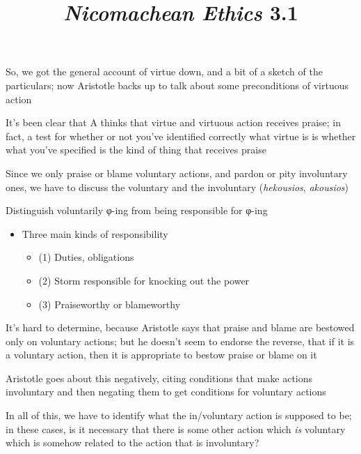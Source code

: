 \documentclass[11pt]{article}
\title{\emph{Nicomachean Ethics} 3.1}
\author{}
\date{}
\newcommand{\gk}[1]{\textgreek{#1}}
\begin{document}
\maketitle

\noindent So, we got the general account of virtue down, and a bit of a sketch of the particulars; now Aristotle backs up to talk about some preconditions of virtuous action
\vspace*{2mm}

\noindent It's been clear that A thinks that virtue and virtuous action receives praise; in fact, a test for whether or not you've identified correctly what virtue is is whether what you've specified is the kind of thing that receives praise
\vspace*{2mm}

\noindent Since we only praise or blame voluntary actions, and pardon or pity involuntary ones, we have to discuss the voluntary and the involuntary (\emph{hekousios}, \emph{akousios})
\vspace*{2mm}

\noindent Distinguish voluntarily \gk{φ}-ing from being responsible for \gk{φ}-ing

\begin{itemize}\item{Three main kinds of responsibility}\begin{itemize}\item{(1) Duties, obligations}\item{(2) Storm responsible for knocking out the power}\item{(3) Praiseworthy or blameworthy}\end{itemize}\end{itemize}

\noindent It's hard to determine, because Aristotle says that praise and blame are bestowed only on voluntary actions; but he doesn't seem to endorse the reverse, that if it is a voluntary action, then it is appropriate to bestow praise or blame on it
\vspace*{2mm}

\noindent Aristotle goes about this negatively, citing conditions that make actions involuntary and then negating them to get conditions for voluntary actions
\vspace*{2mm}

\noindent In all of this, we have to identify what the in/voluntary action is supposed to be; in these cases, is it necessary that there is some other action which \emph{is} voluntary which is somehow related to the action that is involuntary?
\vspace*{2mm}
\end{document}
